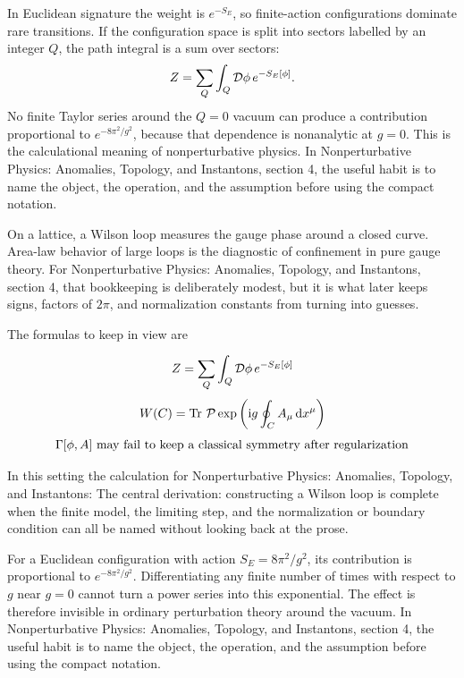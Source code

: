 In Euclidean signature the weight is \(e^{-S_E}\), so finite-action configurations dominate rare transitions.  If the configuration space is split into sectors labelled by an integer \(Q\), the path integral is a sum over sectors:
\[
  Z=\sum_Q\int_Q\mathcal D\phi\,e^{-S_E[\phi]}.
\]
No finite Taylor series around the \(Q=0\) vacuum can produce a contribution proportional to \(e^{-8\pi^2/g^2}\), because that dependence is nonanalytic at \(g=0\).  This is the calculational meaning of nonperturbative physics.  In Nonperturbative Physics: Anomalies, Topology, and Instantons, section 4, the useful habit is to name the object, the operation, and the assumption before using the compact notation.

On a lattice, a Wilson loop measures the gauge phase around a closed curve.  Area-law behavior of large loops is the diagnostic of confinement in pure gauge theory.  For Nonperturbative Physics: Anomalies, Topology, and Instantons, section 4, that bookkeeping is deliberately modest, but it is what later keeps signs, factors of \(2\pi\), and normalization constants from turning into guesses.

The formulas to keep in view are

\[
  Z=\sum_Q\int_Q\mathcal D\phi\,e^{-S_E[\phi]}
\]
\[
  W(C)=\operatorname{Tr}\,\mathcal P\exp\left(\mathrm i g\oint_C A_\mu\,\mathrm d x^\mu\right)
\]
\[
  \Gamma[\phi,A]\hbox{ may fail to keep a classical symmetry after regularization}
\]

In this setting the calculation for Nonperturbative Physics: Anomalies, Topology, and Instantons: The central derivation: constructing a Wilson loop is complete when the finite model, the limiting step, and the normalization or boundary condition can all be named without looking back at the prose.




\begin{example}
For a Euclidean configuration with action \(S_E=8\pi^2/g^2\), its contribution is proportional to \(e^{-8\pi^2/g^2}\).  Differentiating any finite number of times with respect to \(g\) near \(g=0\) cannot turn a power series into this exponential.  The effect is therefore invisible in ordinary perturbation theory around the vacuum.  In Nonperturbative Physics: Anomalies, Topology, and Instantons, section 4, the useful habit is to name the object, the operation, and the assumption before using the compact notation.
\end{example}



